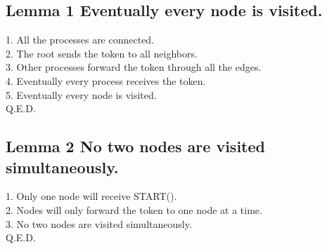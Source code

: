 \documentclass{article}
\begin{document}
\subsection{Lemma 1 Eventually every node is visited.}
1. All the processes are connected.\\
2. The root sends the token to all neighbors.\\
3. Other processes forward the token through all the edges.\\
4. Eventually every process receives the token.\\
5. Eventually every node is visited.\\
Q.E.D.


\subsection{Lemma 2 No two nodes are visited simultaneously.}
1. Only one node will receive START().\\
2. Nodes will only forward the token to one node at a time.\\
3. No two nodes are visited simultaneously.\\
Q.E.D.
\end{document}
